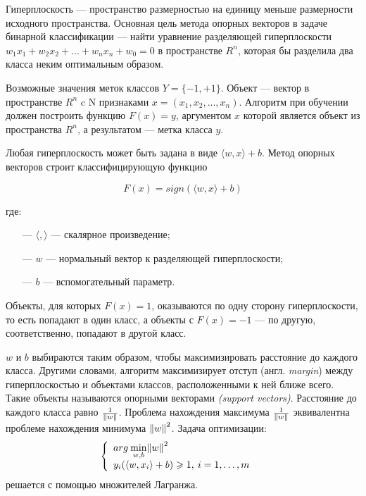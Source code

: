 Гиперплоскость — пространство размерностью на единицу меньше размерности исходного пространства.
Основная цель метода опорных векторов в задаче бинарной классификации — найти уравнение разделяющей гиперплоскости $w_1x_1+w_2x_2+…+w_nx_n+w_0=0$
в пространстве $R^n$, которая бы разделила два класса неким оптимальным образом.

Возможные значения меток классов $Y = \{-1, +1\}$. Объект — вектор в пространстве $R^n$ c
N признаками $x = (x_1, x_2, \dots, x_n)$. Алгоритм при обучении должен построить функцию
$F(x)=y$, аргументом $x$ которой является объект из пространства $R^n$, а результатом — метка класса $y$.

Любая гиперплоскость может быть задана в виде $\langle w, x \rangle + b$.
Метод опорных векторов строит классифицирующую функцию

\begin{equation}\label{eq5}
    F(x) = sign(\langle w, x \rangle + b)
\end{equation}

где:
\begin{itemize}
    \item[—] $\langle , \rangle$ — скалярное произведение;
    \item[—] $w$ — нормальный вектор к разделяющей гиперплоскости;
    \item[—] $b$ — вспомогательный параметр.
\end{itemize}

Объекты, для которых $F(x) = 1$, оказываются по одну сторону гиперплоскости,
то есть попадают в один класс, а объекты с $F(x) = -1$ — по другую, соответственно,
попадают в другой класс.

$w$ и $b$ выбираются таким образом, чтобы максимизировать расстояние до каждого класса.
Другими словами, алгоритм максимизирует отступ (англ. \emph{margin}) между гиперплоскостью
и объектами классов, расположенными к ней ближе всего. Такие объекты называются опорными векторами \emph{(support vectors)}.
Расстояние до каждого класса равно $\frac {1}{\Arrowvert w \Arrowvert}$. Проблема нахождения максимума
$\frac {1}{\Arrowvert w \Arrowvert}$ эквивалентна проблеме нахождения минимума ${\Arrowvert w \Arrowvert}^2$.
Задача оптимизации:
\begin{equation}\label{eq6}
    \left\{ \begin{array}{ll} arg \: \underset{w,b}{\min} {\Arrowvert w \Arrowvert}^2 & \textrm{}\\ y_i(\langle w,x_i \rangle + b) \geqslant 1, \: i = 1, \dots, m \end{array} \right.
\end{equation}
решается с помощью множителей Лагранжа.

